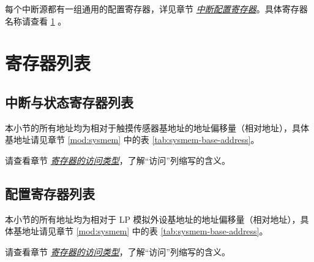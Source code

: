\documentclass[main\_\_CN.tex]{subfiles}
\begin{document}
每个中断源都有一组通用的配置寄存器，详见章节 \hyperref[interrupt-config-registers]{\textit{中断配置寄存器}}。具体寄存器名称请查看 \ref{sec:tchsen-reg-summ} \textit{}。





\newpage
\begin{landscape}
\hypertarget{tchsen-reg-summ}{}
\section{寄存器列表}
\label{sec:tchsen-reg-summ}

\subsection{中断与状态寄存器列表}
\label{sec:tchsen-status-reg-summ}

本小节的所有地址均为相对于触摸传感器基地址的地址偏移量（相对地址），具体基地址请见章节 \ref{mod:sysmem} \textit{} 中的表 \ref{tab:sysmem-base-address}。

请查看章节 \hyperref[glossary-access-types]{\textit{寄存器的访问类型}}，了解“访问”列缩写的含义。



\subsection{配置寄存器列表}
\label{sec:tchsen-config-reg-summ}

本小节的所有地址均为相对于 LP 模拟外设基地址的地址偏移量（相对地址），具体基地址请见章节 \ref{mod:sysmem} \textit{} 中的表 \ref{tab:sysmem-base-address}。

请查看章节 \hyperref[glossary-access-types]{\textit{寄存器的访问类型}}，了解“访问”列缩写的含义。


\end{landscape}


\end{document}
